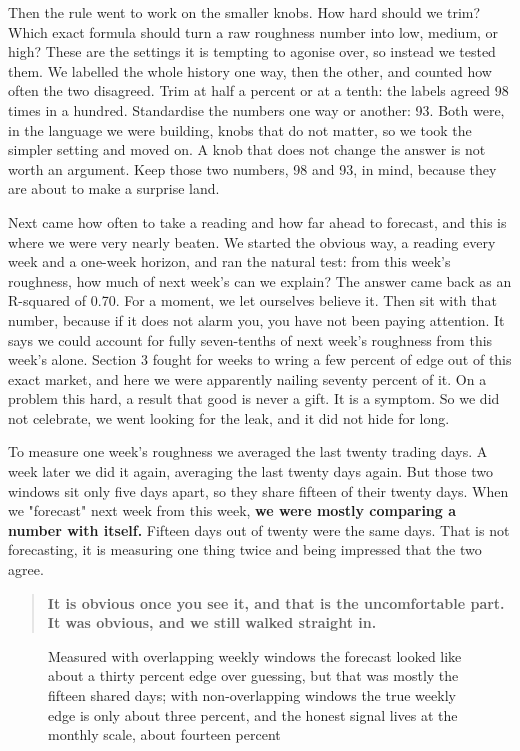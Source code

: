 \documentclass[11pt]{article} %
\begin{document}
Then the rule went to work on the smaller knobs. How hard should we trim? Which exact formula should turn a raw roughness number into low, medium, or high? These are the settings it is tempting to agonise over, so instead we tested them. We labelled the whole history one way, then the other, and counted how often the two disagreed. Trim at half a percent or at a tenth: the labels agreed 98 times in a hundred. Standardise the numbers one way or another: 93. Both were, in the language we were building, knobs that do not matter, so we took the simpler setting and moved on. A knob that does not change the answer is not worth an argument. Keep those two numbers, 98 and 93, in mind, because they are about to make a surprise land.

Next came how often to take a reading and how far ahead to forecast, and this is where we were very nearly beaten. We started the obvious way, a reading every week and a one-week horizon, and ran the natural test: from this week's roughness, how much of next week's can we explain? The answer came back as an R-squared of 0.70. For a moment, we let ourselves believe it. Then sit with that number, because if it does not alarm you, you have not been paying attention. It says we could account for fully seven-tenths of next week's roughness from this week's alone. Section 3 fought for weeks to wring a few percent of edge out of this exact market, and here we were apparently nailing seventy percent of it. On a problem this hard, a result that good is never a gift. It is a symptom. So we did not celebrate, we went looking for the leak, and it did not hide for long.

To measure one week's roughness we averaged the last twenty trading days. A week later we did it again, averaging the last twenty days again. But those two windows sit only five days apart, so they share fifteen of their twenty days. When we "forecast" next week from this week, \textbf{we were mostly comparing a number with itself.} Fifteen days out of twenty were the same days. That is not forecasting, it is measuring one thing twice and being impressed that the two agree.


\begin{quote}
\textbf{It is obvious once you see it, and that is the uncomfortable part. It was obvious, and we still walked straight in.}
\end{quote}


\begin{figure}[htbp]
\centering

\caption{Measured with overlapping weekly windows the forecast looked like about a thirty percent edge over guessing, but that was mostly the fifteen shared days; with non-overlapping windows the true weekly edge is only about three percent, and the honest signal lives at the monthly scale, about fourteen percent}
\end{figure}
\end{document}
